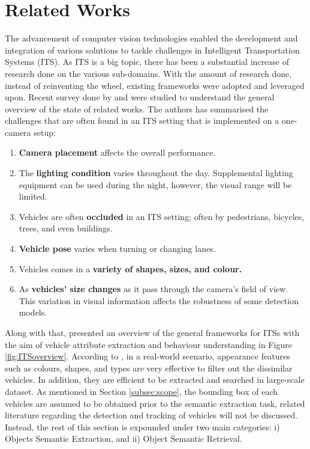 \section{Related Works}
\label{section:relatedworks}

The advancement of computer vision technologies enabled the development and integration of various solutions to tackle challenges in Intelligent Transportation Systems (ITS). As ITS is a big topic, there has been a substantial increase of research done on the various sub-domains. With the amount of research done, instead of reinventing the wheel, existing frameworks were adopted and leveraged upon. Recent survey done by  and  were studied to understand the general overview of the state of related works. The authors has summarised the challenges that are often found in an ITS setting that is implemented on a one-camera setup: 
\begin{enumerate}
    \item \textbf{Camera placement} affects the overall performance. 
    \item The \textbf{lighting condition} varies throughout the day. Supplemental lighting equipment can be used during the night, however, the visual range will be limited.
    \item Vehicles are often \textbf{occluded} in an ITS setting; often by pedestrians, bicycles, trees, and even buildings.
    \item \textbf{Vehicle pose} varies when turning or changing lanes.
    \item Vehicles comes in a \textbf{variety of shapes, sizes, and colour.}
    \item As \textbf{vehicles' size changes} as it pass through the camera's field of view. This variation in visual information affects the robustness of some detection models. 
\end{enumerate}
Along with that,  presented an overview of the general frameworks for ITSs with the aim of vehicle attribute extraction and behaviour understanding in Figure \ref{fig:ITSoverview}. According to , in a real-world scenario, appearance features such as colours, shapes, and types are very effective to filter out the dissimilar vehicles. In addition, they are efficient to be extracted and searched in large-scale dataset. 
As mentioned in Section \ref{subsec:scope}, the bounding box of each vehicles are assumed to be obtained prior to the semantic extraction task, related literature regarding the detection and tracking of vehicles will not be discussed. 
Instead, the rest of this section is expounded under two main categories: i) Objects Semantic Extraction, and ii) Object Semantic Retrieval. 


